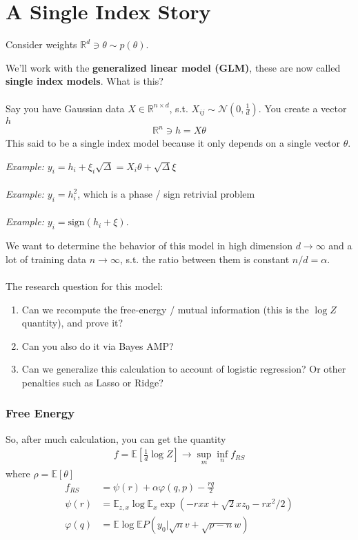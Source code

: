 \section{A Single Index Story}
Consider weights $\mathbb R^d\ni \theta \sim p(\theta)$.

We'll work with the \textbf{generalized linear model (GLM)}, these are now called \textbf{single index models}. What is this?\\
\\
Say you have Gaussian data $X \in \mathbb R^{n \times d}$, s.t. $X_{ij} \sim \mathcal N(0, \frac{1}{d})$. You create a vector $h$
\begin{align}
	\mathbb R^n \ni h = X \theta
\end{align}
This said to be a single index model because it only depends on a single vector $\theta$. 
\begin{sidework}
	\emph{Example:} $y_i = h_i + \xi_i \sqrt{\Delta} = X_i \theta + \sqrt{\Delta} \xi$\\
	\\
	\emph{Example:} $y_i = h_i^2$, which is a phase / sign retrivial problem
	\\
	\\
	\emph{Example:} $y_i = \text{sign}(h_i + \xi)$.
\end{sidework}
We want to determine the behavior of this model in high dimension $d \to \infty$ and a lot of training data $n \to \infty$, s.t. the ratio between them is constant $n / d = \alpha$.\\
\\
The research question for this model:
\begin{enumerate}
	\item Can we recompute the free-energy / mutual information (this is the $\log Z$ quantity), and prove it?
	\item Can you also do it via Bayes AMP?
	\item Can we generalize this calculation to account of logistic regression? Or other penalties such as Lasso or Ridge?
\end{enumerate}
\subsubsection{Free Energy}
So, after much calculation, you can get the quantity
\begin{align}
	f = \mathbb E[\frac{1}{d} \log Z] \to \sup_m \inf_n f_{RS}
\end{align}
where $\rho = \mathbb E[\theta]$
\begin{align}
	f_{RS} & = \psi(r) + \alpha \varphi(q, p) - \frac{r q}{2}\\
	\psi(r) &= \mathbb E_{z, x} \log \mathbb E_x \exp \left( - r x x + \sqrt{2} x z_0 - r x^2/2 \right)\\
	\varphi(q) & = \mathbb E \log \mathbb E P(y_0 | \sqrt{n} v + \sqrt{\rho - n} w)
 \end{align}
